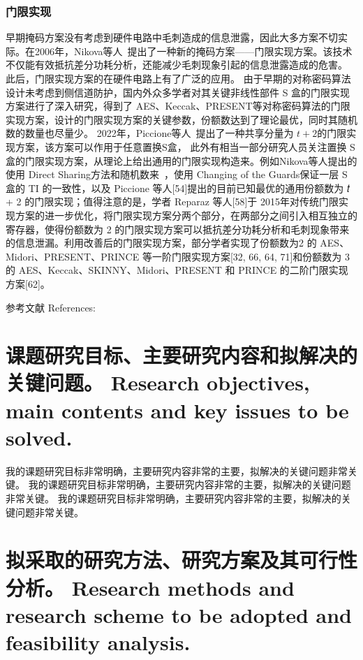 \documentclass[a4paper,zihao=-4,AutoFakeBold]{ctexart}
\begin{document}
\subsubsection{门限实现}
早期掩码方案没有考虑到硬件电路中毛刺造成的信息泄露，因此大多方案不切实际。在2006年，Nikova等人~\cite{Nikova06TI}提出了一种新的掩码方案——门限实现方案。该技术不仅能有效抵抗差分功耗分析，还能减少毛刺现象引起的信息泄露造成的危害。
此后，门限实现方案的在硬件电路上有了广泛的应用。
由于早期的对称密码算法设计未考虑到侧信道防护，国内外众多学者对其关键非线性部件 S 盒的门限实现方案进行了深入研究，得到了 AES、Keccak、PRESENT等对称密码算法的门限实现方案，设计的门限实现方案的关键参数，份额数达到了理论最优，同时其随机数的数量也尽量少。
2022年，Piccione等人~\cite{Piccione23TI_tp2}提出了一种共享分量为 $t+2$的门限实现方案，该方案可以作用于任意置换S盒，
此外有相当一部分研究人员关注置换 S 盒的门限实现方案，从理论上给出通用的门限实现构造来。例如Nikova等人提出的使用 Direct Sharing方法和随机数来~\cite{NikovaRSJoC11}，使用 Changing of the Guards保证一层 S 盒的 TI 的一致性，以及 Piccione 等人[54]提出的目前已知最优的通用份额数为 𝑡 + 2 的门限实现；值得注意的是，学者 Reparaz 等人[58]于 2015年对传统门限实现方案的进一步优化，将门限实现方案分两个部分，在两部分之间引入相互独立的寄存器，使得份额数为 2 的门限实现方案可以抵抗差分功耗分析和毛刺现象带来的信息泄漏。利用改善后的门限实现方案，部分学者实现了份额数为2 的 AES、Midori、PRESENT、PRINCE 等一阶门限实现方案[32, 66, 64, 71]和份额数为 3 的 AES、Keccak、SKINNY、Midori、PRESENT 和 PRINCE 的二阶门限实现方案[62]。

\vspace{2\baselineskip}
{
    \linespread{1.25}\selectfont%
    参考文献 References: 
    \printbibliography[heading=none]
}


\section{课题研究目标、主要研究内容和拟解决的关键问题。 
    Research objectives, main contents and key issues to be solved.}

我的课题研究目标非常明确，主要研究内容非常的主要，拟解决的关键问题非常关键。
我的课题研究目标非常明确，主要研究内容非常的主要，拟解决的关键问题非常关键。
我的课题研究目标非常明确，主要研究内容非常的主要，拟解决的关键问题非常关键。



\section{拟采取的研究方法、研究方案及其可行性分析。
    Research methods and research scheme to be adopted 
    and feasibility analysis.}
\end{document}
